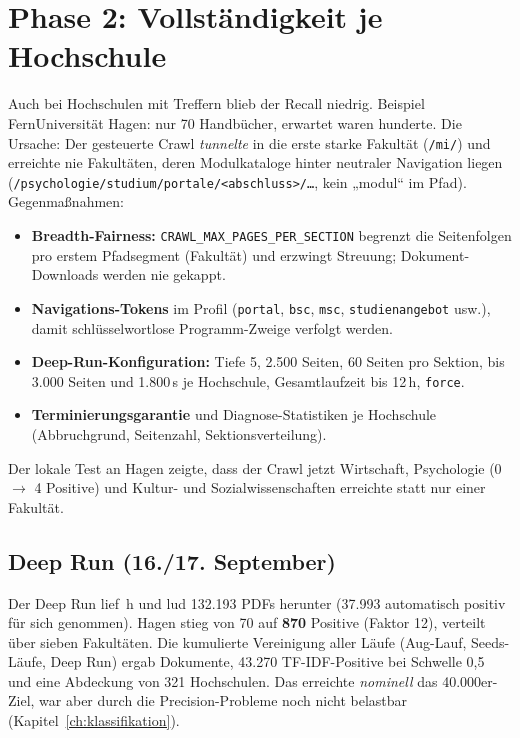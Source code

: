 \section{Phase 2: Vollständigkeit je Hochschule}
Auch bei Hochschulen mit Treffern blieb der Recall niedrig. Beispiel FernUniversität Hagen: nur 70 Handbücher, erwartet waren hunderte. Die Ursache: Der gesteuerte Crawl \emph{tunnelte} in die erste starke Fakultät (\texttt{/mi/}) und erreichte nie Fakultäten, deren Modulkataloge hinter neutraler Navigation liegen (\texttt{/psychologie/studium/portale/<abschluss>/…}, kein „modul“ im Pfad). Gegenmaßnahmen:
\begin{itemize}
  \item \textbf{Breadth-Fairness:} \texttt{CRAWL\_MAX\_PAGES\_PER\_SECTION} begrenzt die Seitenfolgen pro erstem Pfadsegment (Fakultät) und erzwingt Streuung; Dokument-Downloads werden nie gekappt.
  \item \textbf{Navigations-Tokens} im Profil (\texttt{portal}, \texttt{bsc}, \texttt{msc}, \texttt{studienangebot} usw.), damit schlüsselwortlose Programm-Zweige verfolgt werden.
  \item \textbf{Deep-Run-Konfiguration:} Tiefe 5, 2.500 Seiten, 60 Seiten pro Sektion, bis 3.000 Seiten und 1.800\,s je Hochschule, Gesamtlaufzeit bis 12\,h, \texttt{force}.
  \item \textbf{Terminierungsgarantie} und Diagnose-Statistiken je Hochschule (Abbruchgrund, Seitenzahl, Sektionsverteilung).
\end{itemize}
Der lokale Test an Hagen zeigte, dass der Crawl jetzt Wirtschaft, Psychologie (0 $\to$ 4 Positive) und Kultur- und Sozialwissenschaften erreichte statt nur einer Fakultät.

\subsection{Deep Run (16./17. September)}
Der Deep Run lief \zDauerDeep{}\,h und lud 132.193 PDFs herunter (37.993 automatisch positiv für sich genommen). Hagen stieg von 70 auf \textbf{870} Positive (Faktor 12), verteilt über sieben Fakultäten. Die kumulierte Vereinigung aller Läufe (Aug-Lauf, Seeds-Läufe, Deep Run) ergab \zDocsTotal{} Dokumente, 43.270 TF-IDF-Positive bei Schwelle 0,5 und eine Abdeckung von 321 Hochschulen. Das erreichte \emph{nominell} das 40.000er-Ziel, war aber durch die Precision-Probleme noch nicht belastbar (Kapitel~\ref{ch:klassifikation}).


